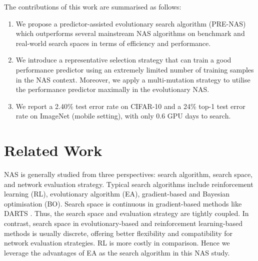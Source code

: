 \documentclass[sigconf]{acmart}
\begin{document}
The contributions of this work are summarised as follows:
\begin{enumerate}









    \item We propose a predictor-assisted evolutionary search algorithm (PRE-NAS) which outperforms several mainstream NAS algorithms on benchmark and real-world search spaces in terms of efficiency and performance.
    
    \item We introduce a representative selection strategy that can train a good performance predictor using an extremely limited number of training samples in the NAS context. Moreover, we apply a multi-mutation strategy to utilise the performance predictor maximally in the evolutionary NAS.
    


    \item We report a 2.40\% test error rate on CIFAR-10 and a 24\% top-1 test error rate on ImageNet (mobile setting), with only 0.6 GPU days to search.
    


\end{enumerate}

\section{Related Work}
\label{section2}
NAS is generally studied from three perspectives: search algorithm, search space, and network evaluation strategy.  Typical search algorithms include reinforcement learning (RL), evolutionary algorithm (EA), gradient-based and Bayesian optimisation (BO). Search space is continuous in gradient-based methods like DARTS \cite{Ref:10}. Thus, the search space and evaluation strategy are tightly coupled. In contrast, search space in evolutionary-based \cite{Ref:36,Ref:51,Ref:08,Ref:40,Ref:37,Ref:07} and reinforcement learning-based \cite{Ref:01,Ref:39} methods is usually discrete, offering better flexibility and compatibility for network evaluation strategies.  RL is more costly in comparison.  Hence we leverage the advantages of EA as the search algorithm in this NAS study.
\end{document}
